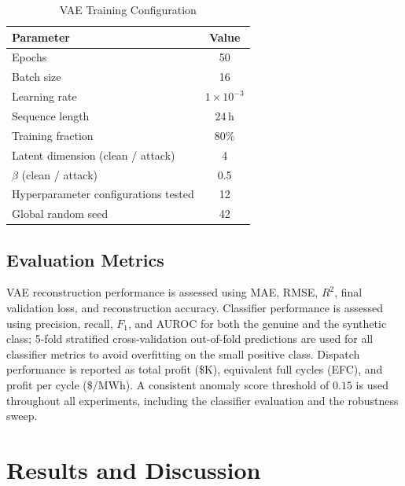 \documentclass[journal]{IEEEtran}
\begin{document}
\begin{table}[!t]
\centering
\caption{VAE Training Configuration}
\label{tab:vae_config}
\begin{tabular}{lc}
\hline
\textbf{Parameter} & \textbf{Value} \\
\hline
Epochs                               & 50 \\
Batch size                           & 16 \\
Learning rate                        & $1 \times 10^{-3}$ \\
Sequence length                      & 24\,h \\
Training fraction                    & 80\% \\
Latent dimension (clean / attack)    & 4 \\
$\beta$ (clean / attack)             & 0.5 \\
Hyperparameter configurations tested & 12 \\
Global random seed                   & 42 \\
\hline
\end{tabular}
\end{table}

\subsection{Evaluation Metrics}
VAE reconstruction performance is assessed using MAE, RMSE, $R^2$, final validation loss, and reconstruction accuracy. Classifier performance is assessed using precision, recall, $F_1$, and AUROC for both the genuine and the synthetic class; 5-fold stratified cross-validation out-of-fold predictions are used for all classifier metrics to avoid overfitting on the small positive class. Dispatch performance is reported as total profit (\$K), equivalent full cycles (EFC), and profit per cycle (\$/MWh). A consistent anomaly score threshold of $0.15$ is used throughout all experiments, including the classifier evaluation and the robustness sweep.

\section{Results and Discussion}
\end{document}
